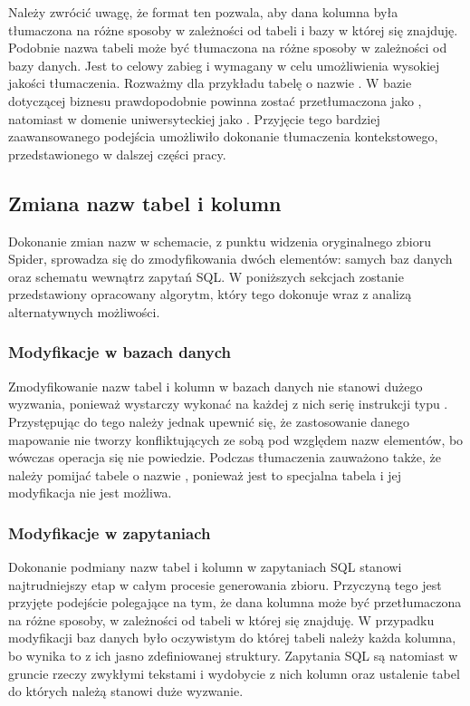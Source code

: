 \begin{minipage}{\linewidth}

\end{minipage}

Należy zwrócić uwagę, że format ten pozwala, aby dana kolumna była tłumaczona na różne sposoby w zależności od tabeli i bazy w której się znajduję. Podobnie nazwa tabeli może być tłumaczona na różne sposoby w zależności od bazy danych. Jest to celowy zabieg i wymagany w celu umożliwienia wysokiej jakości tłumaczenia. Rozważmy dla przykładu tabelę o nazwie . W bazie dotyczącej biznesu prawdopodobnie powinna zostać przetłumaczona jako , natomiast w domenie uniwersyteckiej jako . Przyjęcie tego bardziej zaawansowanego podejścia umożliwiło dokonanie tłumaczenia kontekstowego, przedstawionego w dalszej części pracy.

\subsection{Zmiana nazw tabel i kolumn}
Dokonanie zmian nazw w schemacie, z punktu widzenia oryginalnego zbioru Spider, sprowadza się do zmodyfikowania dwóch elementów: samych baz danych oraz schematu wewnątrz zapytań SQL. W poniższych sekcjach zostanie przedstawiony opracowany algorytm, który tego dokonuje wraz z analizą alternatywnych możliwości. 

\subsubsection{Modyfikacje w bazach danych}
Zmodyfikowanie nazw tabel i kolumn w bazach danych nie stanowi dużego wyzwania, ponieważ wystarczy wykonać na każdej z nich serię instrukcji typu . Przystępując do tego należy jednak upewnić się, że zastosowanie danego mapowanie nie tworzy konfliktujących ze sobą pod względem nazw elementów, bo wówczas operacja się nie powiedzie. Podczas tłumaczenia zauważono także, że należy pomijać tabele o nazwie , ponieważ jest to specjalna tabela i jej modyfikacja nie jest możliwa.

\subsubsection{Modyfikacje w zapytaniach}
Dokonanie podmiany nazw tabel i kolumn w zapytaniach SQL stanowi najtrudniejszy etap w całym procesie generowania zbioru. Przyczyną tego jest przyjęte podejście polegające na tym, że dana kolumna może być przetłumaczona na różne sposoby, w zależności od tabeli w której się znajduję. W przypadku modyfikacji baz danych było oczywistym do której tabeli należy każda kolumna, bo wynika to z ich jasno zdefiniowanej struktury. Zapytania SQL są natomiast w gruncie rzeczy zwykłymi tekstami i wydobycie z nich kolumn oraz ustalenie tabel do których należą stanowi duże wyzwanie.


